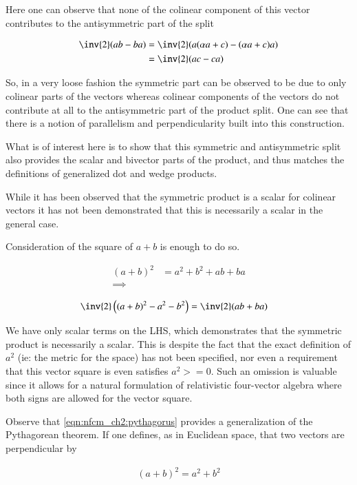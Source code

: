 Here one can observe that none of the colinear component of this vector
contributes to the antisymmetric part of the split

\begin{align*}
\inv{2}(a b - b a) &= \inv{2}(a (\alpha a + c) - (\alpha a + c) a) \\
&= \inv{2}(a c - c a) 
\end{align*}

So, in a very loose fashion the symmetric part can be observed to be
due to only colinear parts of the vectors whereas colinear components of the 
vectors do not contribute at all to the antisymmetric part of the product split.
One can see that there is a notion of parallelism and perpendicularity built
into this construction.

What is of interest here is to show that this symmetric and antisymmetric split
also provides the scalar and bivector parts of the product, and thus matches the
definitions of generalized dot and wedge products.

While it has been observed that the symmetric product is a scalar for colinear vectors
it has not been
demonstrated that this is necessarily a scalar in the general case.

Consideration of the square of $a + b$ is enough to do so.

\begin{align*}
(a + b)^2 &= a^2 + b^2 + ab + ba \\
\implies \\
\end{align*}
\begin{align}\label{eqn:nfcm_ch2:pythagorus}
\inv{2}\left((a + b)^2 - a^2 - b^2\right) &= \inv{2}(ab + ba)
\end{align}

We have only scalar terms on the LHS, which demonstrates that the symmetric product is necessarily a scalar.
This is despite the fact that the exact definition of $a^2$ (ie: the metric for the space) has not been specified, nor even
a requirement that this vector square is even satisfies $a^2 >= 0$.  Such an omission is valuable since it allows
for a natural formulation of relativistic four-vector algebra where both signs are allowed for the vector square.

Observe that \ref{eqn:nfcm_ch2:pythagorus} provides a generalization of the Pythagorean theorem.  If one defines, as in
Euclidean space, that two vectors are perpendicular by

\begin{align*}
(a + b)^2 = a^2 + b^2
\end{align*}


